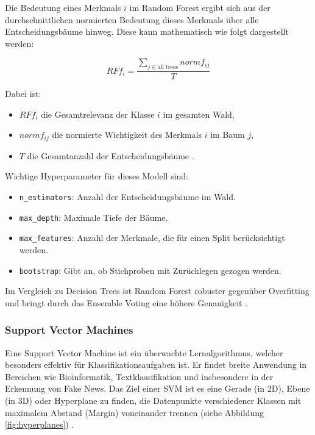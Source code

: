 Die Bedeutung eines Merkmals \( i \) im Random Forest ergibt sich aus der durchschnittlichen normierten Bedeutung 
dieses Merkmals über alle Entscheidungsbäume hinweg. Diese kann mathematisch wie folgt dargestellt werden:

\begin{equation}
    RFf_i = \frac{\sum_{j \in \text{all trees}} normf_{ij}}{T}
\end{equation}

\newpage

Dabei ist:
\begin{itemize}
    \item \( RFf_i \) die Gesamtrelevanz der Klasse \( i \) im gesamten Wald,
    \item \( normf_{ij} \) die normierte Wichtigkeit des Merkmals \( i \) im Baum \( j \),
    \item \( T \) die Gesamtanzahl der Entscheidungsbäume \cite{aslam2022}.
\end{itemize}

Wichtige Hyperparameter für dieses Modell sind:
\begin{itemize}
    \item \texttt{n\_estimators}: Anzahl der Entscheidungsbäume im Wald.
    \item \texttt{max\_depth}: Maximale Tiefe der Bäume.
    \item \texttt{max\_features}: Anzahl der Merkmale, die für einen Split berücksichtigt werden.
    \item \texttt{bootstrap}: Gibt an, ob Stichproben mit Zurücklegen gezogen werden.
\end{itemize}

Im Vergleich zu Decision Trees ist Random Forest robuster gegenüber Overfitting und bringt durch das Ensemble Voting eine 
höhere Genauigkeit \cite{al-tarawneh2025}.

\subsubsection{Support Vector Machines}

Eine Support Vector Machine ist ein überwachte Lernalgorithmus, welcher besonders effektiv für Klassifikationsaufgaben ist. 
Er findet breite Anwendung in Bereichen wie Bioinformatik, Textklassifikation und insbesondere in der Erkennung von Fake News. 
Das Ziel einer SVM ist es eine Gerade (in 2D), Ebene (in 3D) oder Hyperplane zu finden, 
die Datenpunkte verschiedener Klassen mit maximalem Abstand (Margin) voneinander trennen (siehe Abbildung \ref{fig:hyperplanes}) 
\cite{Noble:2006aa, Buddhadev2025, sabir2025, jakkula2006tutorial}.

